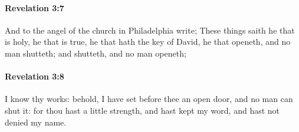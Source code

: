 		\paragraph{Revelation 3:7} %
			\label{REVELATIONNT-3-7}

			And to the angel of the church in Philadelphia write; These things saith he that is holy, he that is true, he that hath the key of David, he that openeth, and no man shutteth; and shutteth, and no man openeth;

			\begin{framed}
			\scriptsize
				\begin{compactdesc}
					\item[SBLG] 
				\end{compactdesc}
			\end{framed}

		\paragraph{Revelation 3:8} %
			\label{REVELATIONNT-3-8}

			I know thy works: behold, I have set before thee an open door, and no man can shut it: for thou hast a little strength, and hast kept my word, and hast not denied my name.

